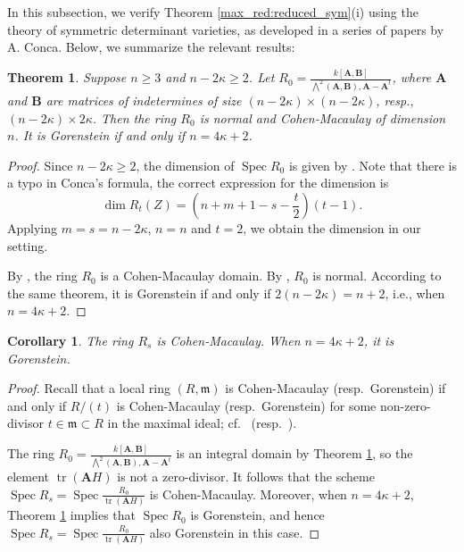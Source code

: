 \documentclass[pdflatex,sn-mathphys-num]{sn-jnl}%
\theoremstyle{thmstyleone}%
\newtheorem{theorem}[subsubsection]{Theorem}%
\newtheorem{corollary}[subsubsection]{Corollary}%
\theoremstyle{thmstyletwo}%
\numberwithin{equation}{subsection}
\theoremstyle{thmstylethree}%
\newcommand{\bA}{\ensuremath{\mathbf{A}}\xspace}
\newcommand{\bB}{\ensuremath{\mathbf{B}}\xspace}
\DeclareMathOperator{\Spec}{Spec}
\DeclareMathOperator{\tr}{tr}
\begin{document}
In this subsection, we verify Theorem \ref{max_red:reduced_sym}(i) using the theory of symmetric determinant varieties, as developed in a series of papers by A. Conca. 
Below, we summarize the relevant results:
\begin{theorem}\label{max_red:Conca}
Suppose $n\geq 3$ and $n-2\kappa\geq 2$. Let $R_0=\frac{k[\bA,\bB]}{\bigwedge^2(\bA,\bB),\bA-\bA^t}$, where $\bA$ and $\bB$ are matrices of indetermines of size $(n-2\kappa)\times (n-2\kappa)$, resp.,\ $(n-2\kappa)\times 2\kappa$. 
Then the ring $R_0$ is normal and Cohen-Macaulay of dimension $n$. It is Gorenstein if and only if $n=4\kappa+2$.
\end{theorem}
\begin{proof}
Since $n-2\kappa\geq 2$, the dimension of $\Spec R_0$ is given by \cite[Page 52]{Conca1994-2}. Note that there is a typo in Conca's formula, the correct expression for the dimension is
\begin{equation*}
	\dim R_t(Z)=(n+m+1-s-\frac{t}{2})(t-1).
\end{equation*}
Applying $m=s=n-2\kappa$, $n=n$ and $t=2$, we obtain the dimension in our setting.
			
By \cite[Proposition 2.5]{Conca1994-2}, the ring $R_0$ is a Cohen-Macaulay domain.
By \cite[Theorem 2.4]{Conca1994-1}, $R_0$ is normal.
According to the same theorem, it is Gorenstein if and only if $2(n-2\kappa)=n+2$, i.e., when $n=4\kappa+2$.
\end{proof}

\begin{corollary}\label{max_red:cm}
The ring $R_s$ is Cohen-Macaulay. When $n=4\kappa+2$, it is Gorenstein.
\end{corollary}
\begin{proof}
Recall that a local ring $(R,\mathfrak{m})$ is Cohen-Macaulay (resp.\ Gorenstein) if and only if $R/(t)$ is Cohen-Macaulay (resp.\ Gorenstein) for some non-zero-divisor $t\in \mathfrak{m}\subset R$ in the maximal ideal; cf.\ \cite[\href{https://stacks.math.columbia.edu/tag/02JN}{02JN}]{Stacks} (resp.\ \cite[\href{https://stacks.math.columbia.edu/tag/0BJJ}{0BJJ}]{Stacks}).

The ring $R_0=\frac{k[\bA,\bB]}{\bigwedge^2(\bA,\bB),\bA-\bA^t}$ is an integral domain by Theorem \ref{max_red:Conca}, so the element $\tr(\bA H)$ is not a zero-divisor. 
It follows that the scheme $\Spec R_s=\Spec \frac{R_0}{\tr(\bA H)}$ is Cohen-Macaulay. 
Moreover, when $n=4\kappa+2$, Theorem \ref{max_red:Conca} implies that $\Spec R_0$ is Gorenstein, and hence $\Spec R_s=\Spec \frac{R_0}{\tr(\bA H)}$ also Gorenstein in this case.
\end{proof}
\end{document}
